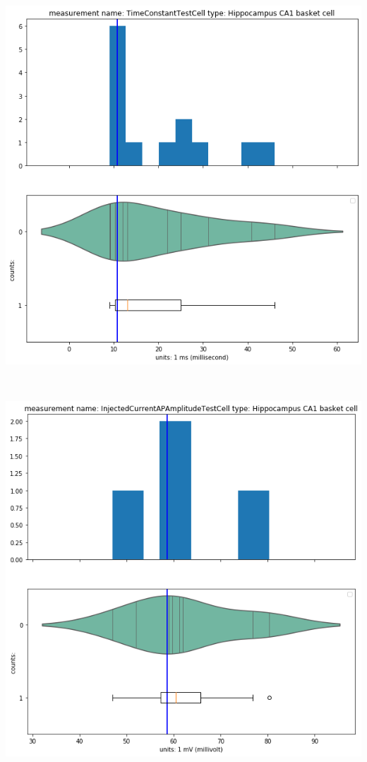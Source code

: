     \begin{center}
    \includegraphics[width=0.7\linewidth]{notebooks_converted/needata_thesis_files/needata_thesis_5_7}
    \end{center}
    { \hspace*{\fill} \\}
    
    \begin{center}
    \includegraphics[width=0.7\linewidth]{notebooks_converted/needata_thesis_files/needata_thesis_5_8}
    \end{center}
    { \hspace*{\fill} \\}
    
